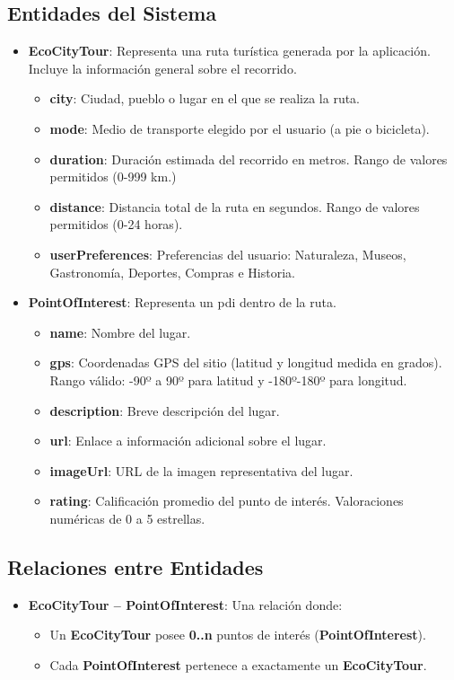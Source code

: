 \subsection{Entidades del Sistema}
\begin{itemize}
	\item \textbf{EcoCityTour}: Representa una ruta turística generada por la aplicación. Incluye la información general sobre el recorrido.
	\begin{itemize}
		\item \textbf{city}: Ciudad, pueblo o lugar en el que se realiza la ruta.
		\item \textbf{mode}: Medio de transporte elegido por el usuario (a pie o bicicleta).
		\item \textbf{duration}: Duración estimada del recorrido en metros. Rango de valores permitidos (0-999 km.)
		\item \textbf{distance}: Distancia total de la ruta en segundos. Rango de valores permitidos (0-24 horas).
		\item \textbf{userPreferences}: Preferencias del usuario: Naturaleza, Museos, Gastronomía, Deportes, Compras e Historia.
	\end{itemize}
	
	\item {\textbf{PointOfInterest}}: Representa un \acrlong{pdi} dentro de la ruta.
	\begin{itemize}
		\item \textbf{name}: Nombre del lugar.
		\item \textbf{gps}: Coordenadas GPS del sitio (latitud y longitud medida en grados). Rango válido: -90º a 90º para latitud y -180º-180º para longitud.
		\item \textbf{description}: Breve descripción del lugar.
		\item \textbf{url}: Enlace a información adicional sobre el lugar.
		\item \textbf{imageUrl}: URL de la imagen representativa del lugar.
		\item \textbf{rating}: Calificación promedio del punto de interés. Valoraciones numéricas de 0 a 5 estrellas.
	\end{itemize}
\end{itemize}

\subsection{Relaciones entre Entidades}
\begin{itemize}
	\item \textbf{EcoCityTour -- PointOfInterest}: Una relación  donde:
	\begin{itemize}
		\item Un \textbf{EcoCityTour} posee \textbf{0..n} puntos de interés (\textbf{PointOfInterest}).
		\item Cada \textbf{PointOfInterest} pertenece a exactamente un \textbf{EcoCityTour}.
	\end{itemize}
\end{itemize}

